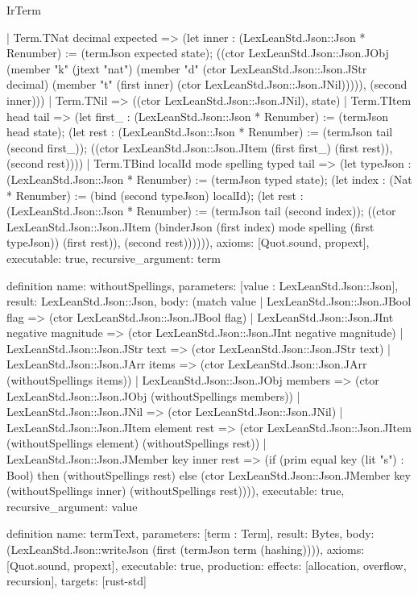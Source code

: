 \begin{lexlean}{IrTerm}
\begin{semanticmodule}
{    | Term.TNat decimal expected => (let inner : (LexLeanStd.Json::Json * Renumber) := (termJson expected state); ((ctor LexLeanStd.Json::Json.JObj (member "k" (jtext "nat") (member "d" (ctor LexLeanStd.Json::Json.JStr decimal) (member "t" (first inner) (ctor LexLeanStd.Json::Json.JNil))))), (second inner)))
    | Term.TNil => ((ctor LexLeanStd.Json::Json.JNil), state)
    | Term.TItem head tail => (let first_ : (LexLeanStd.Json::Json * Renumber) := (termJson head state); (let rest : (LexLeanStd.Json::Json * Renumber) := (termJson tail (second first_)); ((ctor LexLeanStd.Json::Json.JItem (first first_) (first rest)), (second rest))))
    | Term.TBind localId mode spelling typed tail => (let typeJson : (LexLeanStd.Json::Json * Renumber) := (termJson typed state); (let index : (Nat * Renumber) := (bind (second typeJson) localId); (let rest : (LexLeanStd.Json::Json * Renumber) := (termJson tail (second index)); ((ctor LexLeanStd.Json::Json.JItem (binderJson (first index) mode spelling (first typeJson)) (first rest)), (second rest)))))),
  axioms: [Quot.sound, propext],
  executable: true,
  recursive_argument: term
}

definition{
  name: withoutSpellings,
  parameters: [value : LexLeanStd.Json::Json],
  result: LexLeanStd.Json::Json,
  body: (match value
    | LexLeanStd.Json::Json.JBool flag => (ctor LexLeanStd.Json::Json.JBool flag)
    | LexLeanStd.Json::Json.JInt negative magnitude => (ctor LexLeanStd.Json::Json.JInt negative magnitude)
    | LexLeanStd.Json::Json.JStr text => (ctor LexLeanStd.Json::Json.JStr text)
    | LexLeanStd.Json::Json.JArr items => (ctor LexLeanStd.Json::Json.JArr (withoutSpellings items))
    | LexLeanStd.Json::Json.JObj members => (ctor LexLeanStd.Json::Json.JObj (withoutSpellings members))
    | LexLeanStd.Json::Json.JNil => (ctor LexLeanStd.Json::Json.JNil)
    | LexLeanStd.Json::Json.JItem element rest => (ctor LexLeanStd.Json::Json.JItem (withoutSpellings element) (withoutSpellings rest))
    | LexLeanStd.Json::Json.JMember key inner rest => (if (prim equal key (lit "s") : Bool) then (withoutSpellings rest) else (ctor LexLeanStd.Json::Json.JMember key (withoutSpellings inner) (withoutSpellings rest)))),
  executable: true,
  recursive_argument: value
}

definition{
  name: termText,
  parameters: [term : Term],
  result: Bytes,
  body: (LexLeanStd.Json::writeJson (first (termJson term (hashing)))),
  axioms: [Quot.sound, propext],
  executable: true,
  production: {effects: [allocation, overflow, recursion], targets: [rust-std]}
}


\end{semanticmodule}
\end{lexlean}
